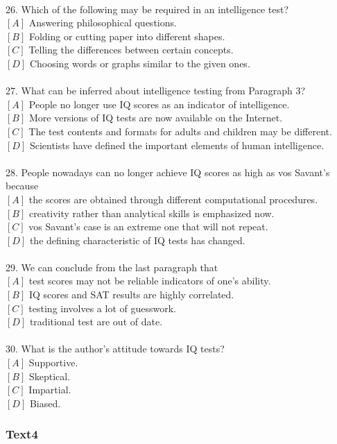 \documentclass[a4paper]{article}
\begin{document}
\\26.	Which of the following may be required in an intelligence test?\\$[A]$ Answering philosophical questions.\\$[B]$ Folding or cutting paper into different shapes.\\$[C]$ Telling the differences between certain concepts.\\$[D]$ Choosing words or graphs similar to the given ones.\\\\27.	What can be inferred about intelligence testing from Paragraph 3?\\$[A]$ People no longer use IQ scores as an indicator of intelligence.\\$[B]$ More versions of IQ tests are now available on the Internet.\\$[C]$ The test contents and formats for adults and children may be different.\\$[D]$ Scientists have defined the important elements of human intelligence.\\\\28.	People nowadays can no longer achieve IQ scores as high as vos Savant’s because\\$[A]$ the scores are obtained through different computational procedures.\\$[B]$ creativity rather than analytical skills is emphasized now.\\$[C]$ vos Savant’s case is an extreme one that will not repeat.\\$[D]$ the defining characteristic of IQ tests has changed.\\\\29.	We can conclude from the last paragraph that\\$[A]$ test scores may not be reliable indicators of one’s ability.\\$[B]$ IQ scores and SAT results are highly correlated.\\$[C]$ testing involves a lot of guesswork.\\$[D]$ traditional test are out of date.\\\\30.	What is the author’s attitude towards IQ tests?\\$[A]$ Supportive.\\$[B]$ Skeptical.\\$[C]$ Impartial.\\$[D]$ Biased.\\\subsubsection{Text4}
\end{document}

